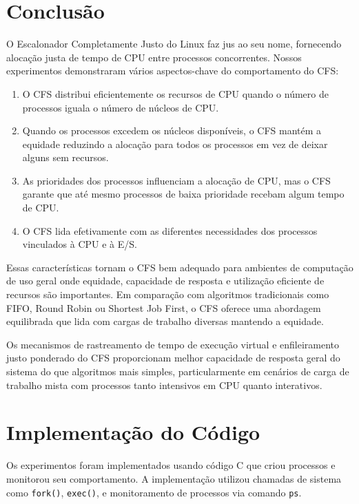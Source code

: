 \documentclass[12pt,a4paper]{article}
\begin{document}
\section{Conclusão}

O Escalonador Completamente Justo do Linux faz jus ao seu nome, fornecendo alocação justa de tempo de CPU entre processos concorrentes. Nossos experimentos demonstraram vários aspectos-chave do comportamento do CFS:

\begin{enumerate}
    \item O CFS distribui eficientemente os recursos de CPU quando o número de processos iguala o número de núcleos de CPU.

    \item Quando os processos excedem os núcleos disponíveis, o CFS mantém a equidade reduzindo a alocação para todos os processos em vez de deixar alguns sem recursos.

    \item As prioridades dos processos influenciam a alocação de CPU, mas o CFS garante que até mesmo processos de baixa prioridade recebam algum tempo de CPU.

    \item O CFS lida efetivamente com as diferentes necessidades dos processos vinculados à CPU e à E/S.
\end{enumerate}

Essas características tornam o CFS bem adequado para ambientes de computação de uso geral onde equidade, capacidade de resposta e utilização eficiente de recursos são importantes. Em comparação com algoritmos tradicionais como FIFO, Round Robin ou Shortest Job First, o CFS oferece uma abordagem equilibrada que lida com cargas de trabalho diversas mantendo a equidade.

Os mecanismos de rastreamento de tempo de execução virtual e enfileiramento justo ponderado do CFS proporcionam melhor capacidade de resposta geral do sistema do que algoritmos mais simples, particularmente em cenários de carga de trabalho mista com processos tanto intensivos em CPU quanto interativos.

\appendix
\section{Implementação do Código}

Os experimentos foram implementados usando código C que criou processos e monitorou seu comportamento. A implementação utilizou chamadas de sistema como \texttt{fork()}, \texttt{exec()}, e monitoramento de processos via comando \texttt{ps}.
\end{document}
